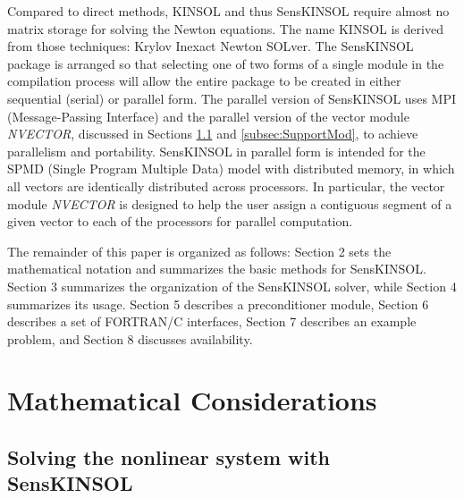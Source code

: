 \documentclass[11pt]{article}
\begin{document}
Compared to direct methods, KINSOL and thus SensKINSOL require almost
no matrix storage for solving the Newton equations. The name
\mbox{KINSOL} is derived from those techniques: Krylov Inexact Newton
SOLver. The SensKINSOL package is arranged so that selecting one of two
forms of a single module in the compilation process will allow the
entire package to be created in either sequential (serial) or parallel
form. The parallel version of SensKINSOL uses MPI (Message-Passing
Interface) \cite{MPI} and the parallel version of the vector module
{\em NVECTOR}, discussed in Sections \ref{subsec:SolvingNonlin} and
\ref{subsec:SupportMod}, to achieve parallelism and portability.
SensKINSOL in parallel form is intended for the SPMD (Single Program
Multiple Data) model with distributed memory, in which all vectors are
identically distributed across processors. In particular, the vector
module {\em NVECTOR} is designed to help the user assign a contiguous
segment of a given vector to each of the processors for parallel
computation.

The remainder of this paper is organized as follows: Section 2 sets
the mathematical notation and summarizes the basic methods for
SensKINSOL. Section 3 summarizes the organization of the SensKINSOL
solver, while Section 4 summarizes its usage.  Section 5 describes a
preconditioner module, Section 6 describes a set of FORTRAN/C
interfaces, Section 7 describes an example problem, and Section 8
discusses availability.


\section{Mathematical Considerations}
\subsection{Solving the nonlinear system with SensKINSOL}
\label{subsec:SolvingNonlin}
\end{document}
